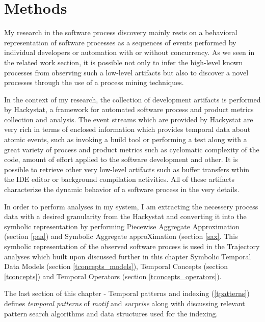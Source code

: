 \chapter{Methods} \label{methods}
My research in the software process discovery mainly rests on a behavioral representation of software processes as a sequences of events performed by individual developers or automation with or without concurrency. As we seen in the related work section, it is possible not only to infer the high-level known processes from observing such a low-level artifacts but also to discover a novel processes through the use of a process mining techniques.

In the context of my research, the collection of development artifacts is performed by Hackystat, a framework for automated software process and product metrics collection and analysis. The event streams which are provided by Hackystat are very rich in terms of enclosed information which provides temporal data about atomic events, such as invoking a build tool or performing a test along with a great variety of process and product metrics such as cyclomatic complexity of the code, amount of effort applied to the software development and other. It is possible to retrieve other very low-level artifacts such as buffer transfers wthin the IDE editor or background compilation activities. All of these artifacts characterize the dynamic behavior of a software process in the very details.

In order to perform analyses in my system, I am extracting the necessery process data with a desired granularity from the Hackystat and converting it into the symbolic representation by performing Piecewise Aggregate Approximation (section \ref{paa}) and Symbolic Aggregate approXimation (section \ref{sax}. This symbolic representation of the observed software process is used in the Trajectory analyses which built upon discussed further in this chapter Symbolic Temporal Data Models (section \ref{tconcepts_models}), Temporal Concepts (section \ref{tconcepts}) and Temporal Operators (section \ref{tconcepts_operators}).

The last section of this chapter - Temporal patterns and indexing (\ref{tpatterns}) defines \textit{temporal patterns} of \textit{motif} and \textit{surprise} along with discussing relevant pattern search algorithms and data structures used for the indexing.